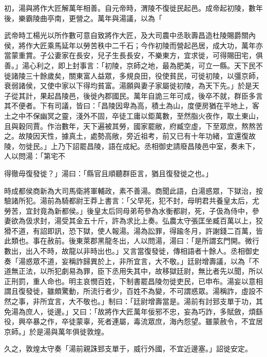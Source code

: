 \begin{pinyinscope}
初，湯與將作大匠解萬年相善。自元帝時，渭陵不復徙民起邑。成帝起初陵，數年後，樂霸陵曲亭南，更營之。萬年與湯議，以為「

武帝時工楊光以所作數可意自致將作大匠，及大司農中丞耿壽昌造杜陵賜爵關內侯，將作大匠乘馬延年以勞苦秩中二千石；今作初陵而營起邑居，成大功，萬年亦當蒙重賞。子公妻家在長安，兒子生長長安，不樂東方，宜求徙，可得賜田宅，俱善。」湯心利之，即上封事言：「初陵，京師之地，最為肥美，可立一縣。天下民不徙諸陵三十餘歲矣，關東富人益眾，多規良田，役使貧民，可徙初陵，以彊京師，衰弱諸侯，又使中家以下得均貧富。湯願與妻子家屬徙初陵，為天下先。」於是天子從其計，果起昌陵邑，後徙內郡國民。萬年自詭三年可成，後卒不就，群臣多言其不便者。下有司議，皆曰：「昌陵因卑為高，積土為山，度便房猶在平地上，客土之中不保幽冥之靈，淺外不固，卒徒工庸以鉅萬數，至然脂火夜作，取土東山，且與穀同賈。作治數年，天下遍被其勞，國家罷敝，府臧空虛，下至眾庶，熬熬苦之。故陵因天性，據真土，處勢高敞，旁近祖考，前又已有十年功緒，宜還復故陵，勿徙民。」上乃下詔罷昌陵，語在成紀。丞相御史請廢昌陵邑中室，奏未下，人以問湯：「第宅不

得徹毋復發徙？」湯曰：「縣官且順聽群臣言，猶且復發徙之也。」

時成都侯商新為大司馬衛將軍輔政，素不善湯。商聞此語，白湯惑眾，下獄治，按驗諸所犯。湯前為騎都尉王莽上書言：「父早死，犯不封，母明君共養皇太后，尤勞苦，宜封竟為新都侯。」後皇太后同母弟苟參為水衡都尉，死，子伋為侍中，參妻欲為伋求封，湯受其金五十斤，許為求比上奏。弘農太守張匡坐臧百萬以上，狡猾不道，有詔即訊，恐下獄，使人報湯。湯為訟罪，得踰冬月，許謝錢二百萬，皆此類也。事在赦前。後東萊郡黑龍冬出，人以問湯，湯曰：「是所謂玄門開。微行數出，出入不時，故龍以非時出也。」又言當復發徙，傳相語者十餘人。丞相御史奏「湯惑眾不道，妄稱詐歸異於上，非所宜言，大不敬。」廷尉增壽議，以為「不道無正法，以所犯劇易為罪，臣下丞用失其中，故移獄廷尉，無比者先以聞，所以正刑罰，重人命也。明主哀憫百姓，下制書罷昌陵勿徙吏民，已申布。湯妄以意相謂且復發徙，雖頗驚動，所流行者少，百姓不為變，不可謂惑眾。湯稱詐，虛設不然之事，非所宜言，大不敬也。」制曰：「廷尉增壽當是。湯前有討郅支單于功，其免湯為庶人，徙邊。」又曰：「故將作大匠萬年佞邪不忠，妄為巧詐，多賦斂，煩繇役，興卒暴之作，卒徒蒙辜，死者連屬，毒流眾庶，海內怨望。雖蒙赦令，不宜居京師。」於是湯與萬年俱徙敦煌。

久之，敦煌太守奏「湯前親誅郅支單于，威行外國，不宜近邊塞。」詔徙安定。


\end{pinyinscope}
